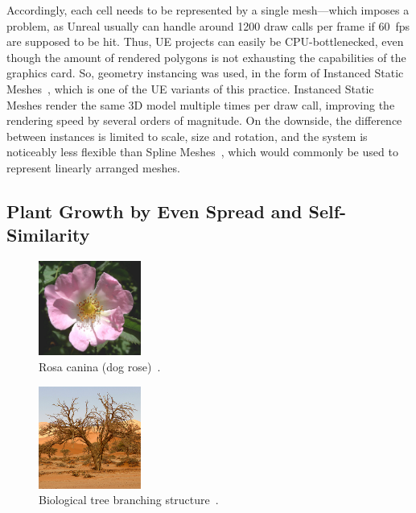 \documentclass[11pt, abstract=on]{scrartcl}
\begin{document}
Accordingly, each cell needs to be represented by a single mesh---which imposes a problem, as Unreal usually can handle around 1200 draw calls per frame if 60~fps are supposed to be hit. Thus, UE projects can easily be CPU-bottlenecked, even though the amount of rendered polygons is not exhausting the capabilities of the graphics card. So, geometry instancing was used, in the form of Instanced Static Meshes~\cite{UEInstancing}, which is one of the UE variants of this practice. Instanced Static Meshes render the same 3D model multiple times per draw call, improving the rendering speed by several orders of magnitude. On the downside, the difference between instances is limited to scale, size and rotation, and the system is noticeably less flexible than Spline Meshes~\cite{UESplines}, which would commonly be used to represent linearly arranged meshes.

\subsection{Plant Growth by Even Spread and Self-Similarity} \label{cpt:EvenSelfSim}

\begin{figure} 
 	\centering
 		\includegraphics[width=0.3\textwidth]{Pic_DogRose.png}
 	\caption{Rosa canina (dog rose)~\cite{WikipediaDogRose}.}
 	\label{fig:DogRose}
\end{figure}

\begin{figure} 
 	\centering
 		\includegraphics[width=0.3\textwidth]{Pic_Tree.png}
 	\caption{Biological tree branching structure~\cite{WikipediaTree}.}
 	\label{fig:IRLTree}
\end{figure}
\end{document}

